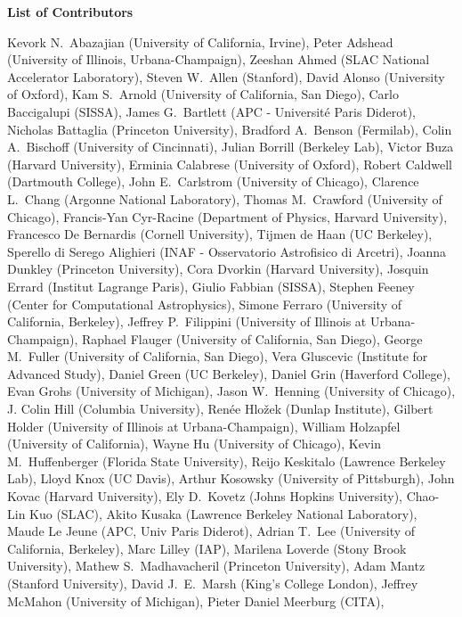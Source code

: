 \begin{center}
\textbf{List of Contributors}
\end{center}
Kevork N.~Abazajian (University of California, Irvine),
Peter Adshead (University of Illinois, Urbana-Champaign),
Zeeshan Ahmed (SLAC National Accelerator Laboratory),
Steven W.~Allen (Stanford),
David Alonso (University of Oxford),
Kam S.~Arnold (University of California, San Diego),
Carlo Baccigalupi (SISSA),
James G.~Bartlett (APC - Université Paris Diderot),
Nicholas Battaglia (Princeton University),
Bradford A.~Benson (Fermilab),
Colin A.~Bischoff (University of Cincinnati),
Julian Borrill (Berkeley Lab),
Victor Buza (Harvard University),
Erminia Calabrese (University of Oxford),
Robert Caldwell (Dartmouth College),
John E.~Carlstrom (University of Chicago),
Clarence L.~Chang (Argonne National Laboratory),
Thomas M.~Crawford (University of Chicago),
Francis-Yan Cyr-Racine (Department of Physics, Harvard University),
Francesco De Bernardis (Cornell University),
Tijmen de Haan (UC Berkeley),
Sperello di Serego Alighieri (INAF - Osservatorio Astrofisico di Arcetri),
Joanna Dunkley (Princeton University),
Cora Dvorkin (Harvard University),
Josquin Errard (Institut Lagrange Paris),
Giulio Fabbian (SISSA),
Stephen Feeney (Center for Computational Astrophysics),
Simone Ferraro (University of California, Berkeley),
Jeffrey P.~Filippini (University of Illinois at Urbana-Champaign),
Raphael Flauger (University of California, San Diego),
George M.~Fuller (University of California, San Diego),
Vera Gluscevic (Institute for Advanced Study),
Daniel Green (UC Berkeley),
Daniel Grin (Haverford College),
Evan Grohs (University of Michigan),
Jason W.~Henning (University of Chicago),
J. Colin Hill (Columbia University),
Ren\'{e}e Hlo\v{z}ek (Dunlap Institute),
Gilbert Holder (University of Illinois at Urbana-Champaign),
William Holzapfel (University of California),
Wayne Hu (University of Chicago),
Kevin M.~Huffenberger (Florida State University),
Reijo Keskitalo (Lawrence Berkeley Lab),
Lloyd Knox (UC Davis),
Arthur Kosowsky (University of Pittsburgh),
John Kovac (Harvard University),
Ely D.~Kovetz (Johns Hopkins University),
Chao-Lin Kuo (SLAC),
Akito Kusaka (Lawrence Berkeley National Laboratory),
Maude Le Jeune (APC, Univ Paris Diderot),
Adrian T.~Lee (University of California, Berkeley),
Marc Lilley (IAP),
Marilena Loverde (Stony Brook University),
Mathew S.~Madhavacheril (Princeton University),
Adam Mantz (Stanford University),
David J.~E.~Marsh (King's College London),
Jeffrey McMahon (University of Michigan),
Pieter Daniel Meerburg (CITA),
